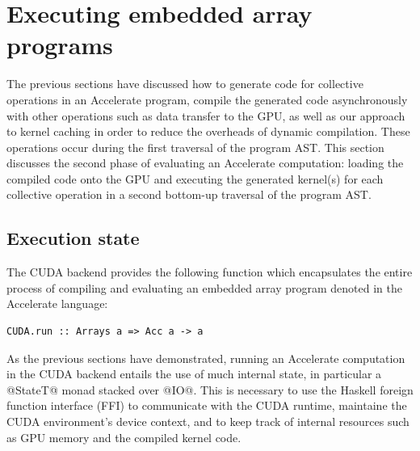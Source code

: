 \section{Executing embedded array programs}
\label{sec:executing_programs}

The previous sections have discussed how to generate code for collective
operations in an Accelerate program, compile the generated code asynchronously
with other operations such as data transfer to the GPU, as well as our approach
to kernel caching in order to reduce the overheads of dynamic compilation. These
operations occur during the first traversal of the program AST\@. This section
discusses the second phase of evaluating an Accelerate computation: loading the
compiled code onto the GPU and executing the generated kernel(s) for each
collective operation in a second bottom-up traversal of the program AST\@.

%


\subsection{Execution state}

The CUDA backend provides the following function which encapsulates the entire
process of compiling and evaluating an embedded array program denoted in the
Accelerate language:
%
\begin{lstlisting}[style=haskell]
CUDA.run :: Arrays a => Acc a -> a
\end{lstlisting}
%
As the previous sections have demonstrated, running an Accelerate computation in
the CUDA backend entails the use of much internal state, in particular a
@StateT@ monad stacked over @IO@. This is necessary to use the Haskell
foreign function interface (FFI) to communicate with the CUDA runtime, maintaine
the CUDA environment's device context, and to keep track of internal resources
such as GPU memory and the compiled kernel code.

